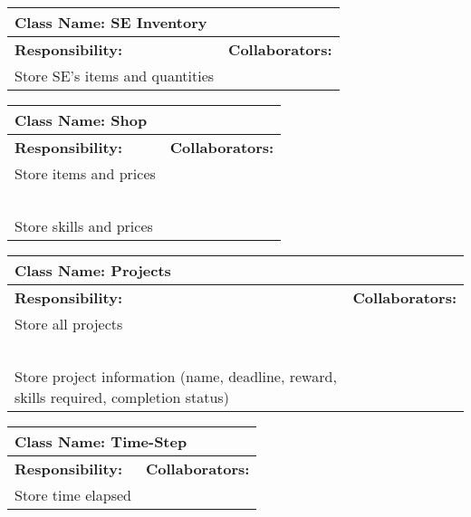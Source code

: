 \documentclass[]{article}
\begin{document}
\begin{table}[H]
    \centering
    \begin{tabular}{|p{7.5cm}|p{7.5cm}|}
        \hline
        \multicolumn{2}{|l|}{\textbf{Class Name:} SE Inventory}\\
        \hline
        \textbf{Responsibility:} & \textbf{Collaborators:}\\
        \hline
        Store SE’s items and quantities & ~\\
        \hline
    \end{tabular}
\end{table}

\begin{table}[H]
    \centering
    \begin{tabular}{|p{7.5cm}|p{7.5cm}|}
        \hline
        \multicolumn{2}{|l|}{\textbf{Class Name:} Shop}\\
        \hline
        \textbf{Responsibility:} & \textbf{Collaborators:}\\
        \hline
        Store items and prices & ~\\
        ~ & ~\\
        Store skills and prices & ~\\
        \hline
    \end{tabular}
\end{table}

\begin{table}[H]
    \centering
    \begin{tabular}{|p{7.5cm}|p{7.5cm}|}
        \hline
        \multicolumn{2}{|l|}{\textbf{Class Name:} Projects}\\
        \hline
        \textbf{Responsibility:} & \textbf{Collaborators:}\\
        \hline
        Store all projects & ~\\
        ~ & ~\\
        Store project information (name, deadline, reward, skills required, completion status) & ~\\
        \hline
    \end{tabular}
\end{table}

\begin{table}[H]
    \centering
    \begin{tabular}{|p{7.5cm}|p{7.5cm}|}
        \hline
        \multicolumn{2}{|l|}{\textbf{Class Name:} Time-Step}\\
        \hline
        \textbf{Responsibility:} & \textbf{Collaborators:}\\
        \hline
        Store time elapsed & ~\\
        \hline
    \end{tabular}
\end{table}
\end{document}
